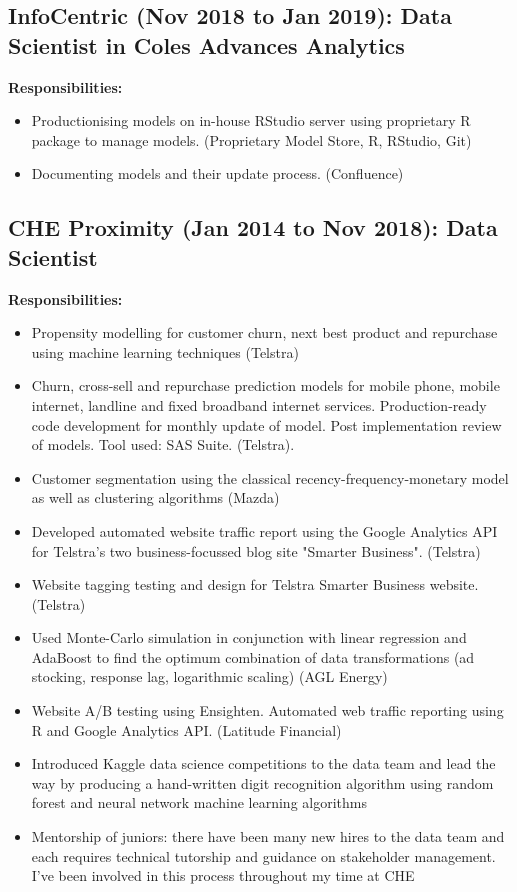 \documentclass{article}
\begin{document}
\subsection{InfoCentric (Nov 2018 to Jan 2019): Data Scientist in Coles Advances Analytics}
\textbf{Responsibilities:}

\begin{itemize}
    \item Productionising models on in-house RStudio server using proprietary R package to manage models. (Proprietary Model Store, R, RStudio, Git)
    \item Documenting models and their update process. (Confluence)
\end{itemize}

\subsection{CHE Proximity (Jan 2014 to Nov 2018): Data Scientist}
\textbf{Responsibilities:}

\begin{itemize}
    \item Propensity modelling for customer churn, next best product and repurchase using machine learning techniques (Telstra)
    \item Churn, cross-sell and repurchase prediction models for mobile phone, mobile internet, landline and fixed broadband internet services. Production-ready code development for monthly update of model. Post implementation review of models. Tool used: SAS Suite. (Telstra).
    \item Customer segmentation using the classical recency-frequency-monetary model as well as clustering algorithms (Mazda)
    \item Developed automated website traffic report using the Google Analytics API for Telstra's two business-focussed blog site "Smarter Business". (Telstra)
    \item Website tagging testing and design for Telstra Smarter Business website. (Telstra)
    \item Used Monte-Carlo simulation in conjunction with linear regression and AdaBoost to find the optimum combination of data transformations (ad stocking, response lag, logarithmic scaling) (AGL Energy)
    \item Website A/B testing using Ensighten. Automated web traffic reporting using R and Google Analytics API. (Latitude Financial)
    \item Introduced Kaggle data science competitions to the data team and lead the way by producing a hand-written digit recognition algorithm using random forest and neural network machine learning algorithms
    \item Mentorship of juniors: there have been many new hires to the data team and each requires technical tutorship and guidance on stakeholder management. I've been involved in this process throughout my time at CHE
\end{itemize}
\end{document}
